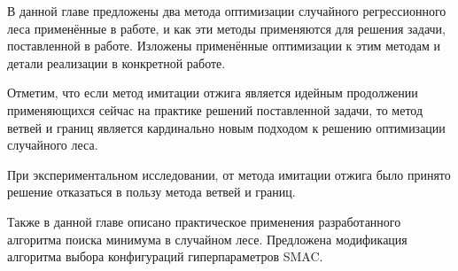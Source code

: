 \chapterconclusion

В данной главе предложены два метода оптимизации случайного регрессионного леса
применённые в работе, и как эти методы применяются для решения задачи,
поставленной в работе. Изложены применённые оптимизации к этим методам и детали
реализации в конкретной работе.

Отметим, что если метод имитации отжига является идейным продолжении
применяющихся сейчас на практике решений поставленной задачи, то метод ветвей
и границ является кардинально новым подходом к решению оптимизации случайного
леса.

При экспериментальном исследовании, от метода имитации отжига было принято решение
отказаться в пользу метода ветвей и границ.

Также в данной главе описано практическое применения разработанного алгоритма
поиска минимума в случайном лесе. Предложена модификация алгоритма выбора
конфигураций гиперпараметров SMAC\@.
